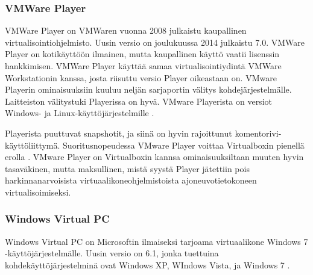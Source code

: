 \subsubsection{VMWare Player}
VMWare Player on VMWaren vuonna 2008 julkaistu kaupallinen virtualisointiohjelmisto. Uusin versio on joulukuussa 2014 julkaistu 7.0. VMWare Player on kotikäyttöön ilmainen, mutta kaupallinen käyttö vaatii lisenssin hankkimisen. VMWare Player käyttää samaa virtualisointiydintä VMWare Workstationin kanssa, josta riisuttu versio Player oikeastaan on. VMware Playerin ominaisuuksiin kuuluu neljän sarjaportin välitys kohdejärjestelmälle. Laitteiston välitystuki Playerissa on hyvä. VMware Playerista on versiot Windows- ja Linux-käyttöjärjestelmille \cite{vmware1}.


Playerista puuttuvat snapshotit, ja siinä on hyvin rajoittunut komentorivi-käyttöliittymä. Suoritusnopeudessa VMware Player voittaa Virtualboxin pienellä erolla \cite{vplayervsvbox}. VMware Player on Virtualboxin kannsa ominaisuuksiltaan muuten hyvin tasaväkinen, mutta maksullinen, mistä syystä Player jätettiin pois harkinnanarvoisista virtuaalikoneohjelmistoista ajoneuvotietokoneen virtualisoimiseksi.






\subsubsection{Windows Virtual PC}
Windows Virtual PC on Microsoftin ilmaiseksi tarjoama virtuaalikone Windows 7 -käyttöjärjestelmälle. Uusin versio on 6.1, jonka tuettuina kohdekäyttöjärjestelminä ovat Windows XP, WIndows Vista, ja Windows 7 \cite{vpc_tips}.

